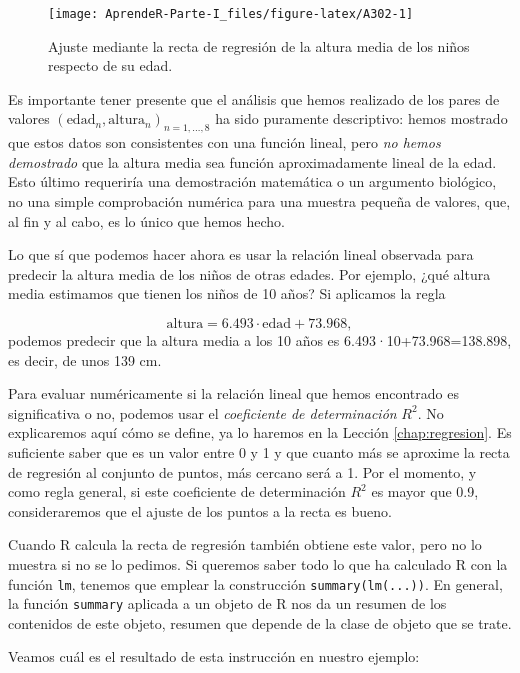 \documentclass[]{book}
\theoremstyle{definition}
\theoremstyle{definition}
\theoremstyle{definition}
\theoremstyle{remark}
\begin{document}
\begin{figure}

{\centering \texttt{[image: AprendeR-Parte-I\_files/figure-latex/A302-1]} 

}

\caption{Ajuste mediante la recta de regresión de la altura media de los niños respecto de su edad.}\label{fig:A302}
\end{figure}

Es importante tener presente que el análisis que hemos realizado de los pares de valores \((\mathrm{edad}_n, \textrm{altura}_n)_{n=1,\ldots,8}\) ha sido puramente descriptivo: hemos mostrado que estos datos son consistentes con una función lineal, pero \emph{no hemos demostrado} que la altura media sea función aproximadamente lineal de la edad. Esto último requeriría una demostración matemática o un argumento biológico, no una simple comprobación numérica para una muestra pequeña de valores, que, al fin y al cabo, es lo único que hemos hecho.

Lo que sí que podemos hacer ahora es usar la relación lineal observada para predecir la altura media de los niños de otras edades. Por ejemplo, ¿qué altura media estimamos que tienen los niños de 10 años? Si aplicamos la regla

\[
\textrm{altura}=6.493\cdot \mathrm{edad}+73.968,
\]
podemos predecir que la altura media a los 10 años es
6.493·10+73.968=138.898, es decir, de unos 139 cm.

Para evaluar numéricamente si la relación lineal que hemos encontrado es significativa o no, podemos usar el \emph{coeficiente de determinación} \(R^2\). No explicaremos aquí cómo se define, ya lo haremos en la Lección \ref{chap:regresion}. Es suficiente saber que es un valor entre 0 y 1 y que cuanto más se aproxime la recta de regresión al conjunto de puntos, más cercano será a 1. Por el momento, y como regla general, si este coeficiente de determinación \(R^2\) es mayor que 0.9, consideraremos que el ajuste de los puntos a la recta es bueno.

Cuando R calcula la recta de regresión también obtiene este valor, pero no lo muestra si no se lo pedimos. Si queremos saber todo lo que ha calculado R con la función \texttt{lm}, tenemos que emplear la construcción \texttt{summary(lm(...))}. En general, la función \texttt{summary} aplicada a un objeto de R nos da un resumen de los contenidos de este objeto, resumen que depende de la clase de objeto que se trate.

Veamos cuál es el resultado de esta instrucción en nuestro ejemplo:
\end{document}
